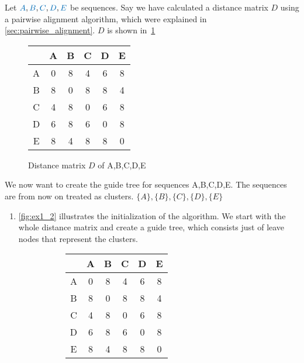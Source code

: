 \begin{example}
 Let $\textcolor{ALUblue}{A},\textcolor{ALUblue}{B},\textcolor{ALUblue}{C},\textcolor{ALUblue}{D},\textcolor{ALUblue}{E}$ be sequences.
 Say we have calculated a distance matrix $D$ using a pairwise alignment algorithm, which were explained in \cref{sec:pairwise_alignment}.
 $D$ is shown in~\cref{fig:ex1_1}
 \begin{figure}[H]
   \centering
   \begin{tabular}{c|c|c|c|c|c|}
   \cline{2-6}
                           & A & B & C & D & E \\ \hline
   \multicolumn{1}{|c|}{A} & 0 & 8 & 4 & 6 & 8 \\ \hline
   \multicolumn{1}{|c|}{B} & 8 & 0 & 8 & 8 & 4 \\ \hline
   \multicolumn{1}{|c|}{C} & 4 & 8 & 0 & 6 & 8 \\ \hline
   \multicolumn{1}{|c|}{D} & 6 & 8 & 6 & 0 & 8 \\ \hline
   \multicolumn{1}{|c|}{E} & 8 & 4 & 8 & 8 & 0 \\ \hline
   \end{tabular}
   \caption{Distance matrix $D$ of A,B,C,D,E }
   \label{fig:ex1_1}
 \end{figure}
We now want to create the guide tree for sequences A,B,C,D,E.
The sequences are from now on treated as clusters. $\{A\},\{B\}, \{C\}, \{D\}, \{E\}$
\begin{enumerate}
  \item \cref{fig:ex1_2} illustrates the initialization of the algorithm.
  We start with the whole distance matrix and create a guide tree, which consists just of leave nodes that represent the clusters.
\begin{figure}[H]
	\centering
	\begin{subfigure}{.4\textwidth}
    \centering
    \begin{tabular}{c|c|c|c|c|c|}
      \cline{2-6}
                              & A & B & C & D & E \\ \hline
      \multicolumn{1}{|c|}{A} & 0 & 8 & 4 & 6 & 8 \\ \hline
      \multicolumn{1}{|c|}{B} & 8 & 0 & 8 & 8 & 4 \\ \hline
      \multicolumn{1}{|c|}{C} & 4 & 8 & 0 & 6 & 8 \\ \hline
      \multicolumn{1}{|c|}{D} & 6 & 8 & 6 & 0 & 8 \\ \hline
      \multicolumn{1}{|c|}{E} & 8 & 4 & 8 & 8 & 0 \\ \hline

\end{tabular}
\end{subfigure}
\end{figure}
\end{enumerate}
\end{example}
